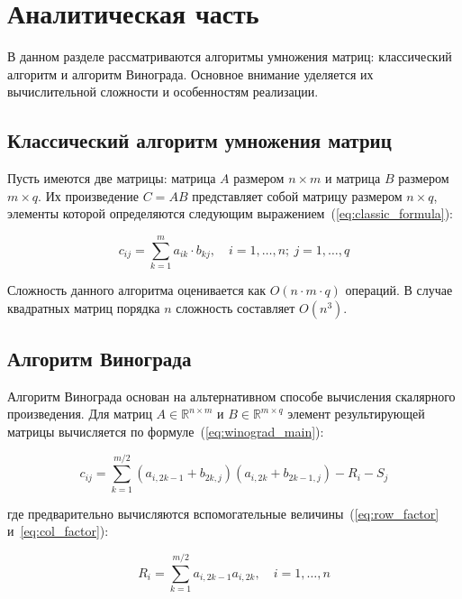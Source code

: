 \chapter{Аналитическая часть}

В данном разделе рассматриваются алгоритмы умножения матриц: классический алгоритм и алгоритм Винограда. Основное внимание уделяется их вычислительной сложности и особенностям реализации.

\section{Классический алгоритм умножения матриц}

Пусть имеются две матрицы: матрица $A$ размером $n \times m$ и матрица $B$ размером $m \times q$. Их произведение $C = AB$ представляет собой матрицу размером $n \times q$, элементы которой определяются следующим выражением~(\ref{eq:classic_formula}):

\begin{equation}
	c_{ij} = \sum_{k=1}^{m} a_{ik} \cdot b_{kj}, \quad i = 1,\ldots,n; \ j = 1,\ldots,q
	\label{eq:classic_formula}
\end{equation}

Сложность данного алгоритма оценивается как $O(n \cdot m \cdot q)$ операций. В случае квадратных матриц порядка $n$ сложность составляет $O(n^3)$.

\section{Алгоритм Винограда}

Алгоритм Винограда основан на альтернативном способе вычисления скалярного произведения. Для матриц $A \in \mathbb{R}^{n \times m}$ и $B \in \mathbb{R}^{m \times q}$ элемент результирующей матрицы вычисляется по формуле~(\ref{eq:winograd_main}):

\begin{equation}
	c_{ij} = \sum_{k=1}^{m/2} (a_{i,2k-1} + b_{2k,j})(a_{i,2k} + b_{2k-1,j}) - R_i - S_j
	\label{eq:winograd_main}
\end{equation}

где предварительно вычисляются вспомогательные величины~(\ref{eq:row_factor} и~\ref{eq:col_factor}):

\begin{equation}
	R_i = \sum_{k=1}^{m/2} a_{i,2k-1}a_{i,2k}, \quad i = 1,\ldots,n
	\label{eq:row_factor}
\end{equation}

